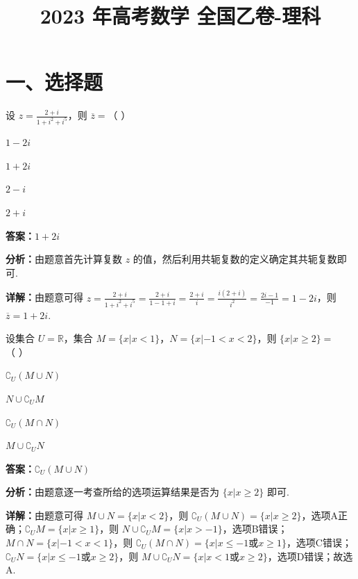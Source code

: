 ﻿\title{2023 年高考数学 全国乙卷-理科}
\date{}
\maketitle

\section*{一、选择题}

\begin{question}[points=5]
设 $z=\frac{2+i}{1+i^{2}+i^{5}}$，则 $\overline{z}=$（ ）
\begin{choices}
  \item $1-2i$
  \item $1+2i$
  \item $2-i$
  \item $2+i$
\end{choices}
\begin{solution}
\textbf{答案：}$1+2i$

\textbf{分析：}由题意首先计算复数 $z$ 的值，然后利用共轭复数的定义确定其共轭复数即可.

\textbf{详解：}由题意可得 $z=\frac{2+i}{1+i^{2}+i^{5}}=\frac{2+i}{1-1+i}=\frac{2+i}{i}=\frac{i(2+i)}{i^{2}}=\frac{2i-1}{-1}=1-2i$，则 $\overline{z}=1+2i$.
\end{solution}
\end{question}

\begin{question}[points=5]
设集合 $U=\mathbb{R}$，集合 $M=\{x|x<1\}$，$N=\{x|-1<x<2\}$，则 $\{x|x\ge 2\}=$（ ）
\begin{choices}
  \item $\complement_U (M\cup N)$
  \item $N\cup \complement_U M$
  \item $\complement_U (M\cap N)$
  \item $M\cup \complement_U N$
\end{choices}
\begin{solution}
\textbf{答案：}$\complement_U (M\cup N)$

\textbf{分析：}由题意逐一考查所给的选项运算结果是否为 $\{x|x\ge 2\}$ 即可.

\textbf{详解：}由题意可得 $M\cup N=\{x|x<2\}$，则 $\complement_U (M\cup N)=\{x|x\ge 2\}$，选项A正确；$\complement_U M=\{x|x\ge 1\}$，则 $N\cup \complement_U M=\{x|x>-1\}$，选项B错误；$M\cap N=\{x|-1<x<1\}$，则 $\complement_U (M\cap N)=\{x|x\le -1$或$x\ge 1\}$，选项C错误；$\complement_U N=\{x|x\le -1$或$x\ge 2\}$，则 $M\cup \complement_U N=\{x|x<1$或$x\ge 2\}$，选项D错误；故选A.
\end{solution}
\end{question}

